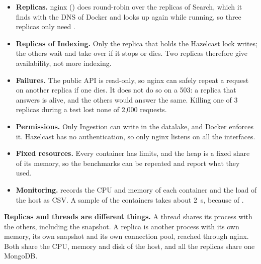 \begin{itemize}
  \item \textbf{Replicas.} nginx () does round-robin over the replicas of Search, which it
        finds with the DNS of Docker and looks up again while running, so three replicas only need
        .
  \item \textbf{Replicas of Indexing.} Only the replica that holds the Hazelcast lock  writes; the
        others wait and take over if it stops or dies. Two replicas therefore give availability, not more indexing.
  \item \textbf{Failures.} The public API is read-only, so nginx can safely repeat a request on another replica if
        one dies. It does not do so on a 503: a replica that answers is alive, and the others would answer the same.
        Killing one of 3 replicas during a test lost none of 2,000 requests.
  \item \textbf{Permissions.} Only Ingestion can write in the datalake, and Docker enforces it. Hazelcast has no
        authentication, so only nginx listens on all the interfaces.
  \item \textbf{Fixed resources.} Every container has limits, and the heap is a fixed share of its memory, so the
        benchmarks can be repeated and report what they used.
  \item \textbf{Monitoring.}  records the CPU and memory of each container and the load of
        the host as CSV. A sample of the containers takes about 2~s, because of .
\end{itemize}

\textbf{Replicas and threads are different things.} A thread shares its process with the others, including the
snapshot. A replica is another process with its own memory, its own snapshot and its own connection pool, reached
through nginx. Both share the CPU, memory and disk of the host, and all the replicas share one MongoDB.
